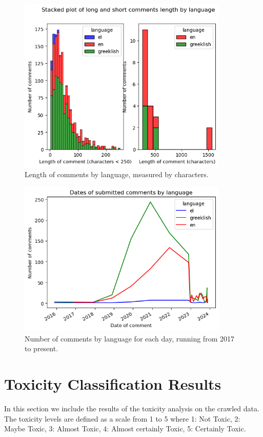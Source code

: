 \documentclass[11pt, a4paper]{article}
\begin{document}
	\begin{figure}[h!]
		\includegraphics[width=10cm]{length_dis.png}
		\centering
		\caption{Length of comments by language, measured by characters.}
		\label{fig:length_dis}
	\end{figure}
	
	\begin{figure}[h!]
		\includegraphics[width=10cm]{time_plot.png}
		\centering
		\caption{Number of comments by language for each day, running from 2017 to present.}
		\label{fig::timeseries.png}
	\end{figure}
	
	
	
	\section{Toxicity Classification Results}
	
	In this section we include the results of the toxicity analysis on the crawled data. The toxicity levels are defined as a scale from 1 to 5 where 1: Not Toxic, 	2: Maybe Toxic, 3: Almost Toxic,	4: Almost certainly Toxic, 5: Certainly Toxic.
	
\end{document}
